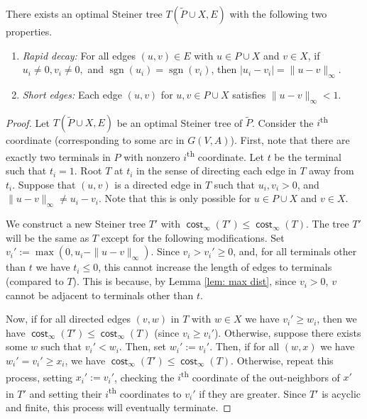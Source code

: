 \documentclass{article}\providecommand{\DeclareRedundantLanguages}[2]{}\usepackage[a4paper,margin=20mm]{geometry}
\DeclareMathOperator{\cost}{\mathsf{cost}}
\DeclareMathOperator{\sgn}{sgn}
\newcommand{\1}{\textbf{1}}
\renewcommand{\tilde}{\widetilde}
\begin{document}
\begin{lemma} \label{lem: structural props}
There exists an optimal Steiner tree $T(\tilde{P} \cup X, E)$ with the following two properties. 
\begin{enumerate}[label=(P\arabic*)]
\item \textit{Rapid decay:} For all edges $(u,v) \in E$ with $u \in P \cup X$ and $v \in X$, if $u_i\neq 0, v_i \neq 0,$ and $\sgn(u_i) = \sgn(v_i)$, then $|u_i - v_i| = \|u - v\|_{\infty}$. \label{cond: max decrease}
\item \textit{Short edges:} Each edge $(u, v)$ for $u,v \in P \cup X$ satisfies $\|u - v\|_{\infty} < 1.$ \label{cond: short edges}
\end{enumerate}
\end{lemma}
\begin{proof}
Let $T(\tilde{P} \cup X, E)$ be an optimal Steiner tree of $\tilde{P}$. Consider the $i$\textsuperscript{th} coordinate (corresponding to some arc in $G(V,A)$). First, note that there are exactly two terminals in $P$ with nonzero $i$\textsuperscript{th} coordinate. Let $t$ be the terminal such that $t_i = 1$. Root $T$ at $t_i$ in the sense of directing each edge in $T$ away from $t_i$. Suppose that $(u,v)$ is a directed edge in $T$ such that $u_i, v_i > 0$, and $\|u - v\|_{\infty} \neq u_i - v_i$. Note that this is only possible for $u \in P \cup X$ and $v \in X$.

We construct a new Steiner tree $T'$ with $\cost_{\infty}(T') \leq \cost_{\infty}(T)$. The tree $T'$ will be the same as $T$ except for the following modifications. Set $v_i'  := \max(0, u_i - \|u - v\|_{\infty})$. Since $v_i > v_i' \geq 0$, and, for all terminals other than $t$ we have $t_i \leq 0$, this cannot increase the length of edges to terminals (compared to $T$). This is because, by Lemma \ref{lem: max dist}, since $v_i > 0$, $v$ cannot be adjacent to terminals other than $t$.
 
 Now, if for all directed edges $(v, w)$ in $T$ with $w \in X$ we have $v_i' \geq w_i$, then we have $\cost_{\infty}(T') \leq \cost_{\infty}(T)$ (since $v_i \geq v_i'$). Otherwise, suppose there exists some $w$ such that $v_i' < w_i$. Then, set $w_i'  := v_i'$. Then, if for all $(w,x)$ we have $w_i' = v_i' \geq x_i$, we have $\cost_{\infty}(T') \leq \cost_{\infty}(T)$. Otherwise, repeat this process, setting $x_i' := v_i'$, checking the $i$\textsuperscript{th} coordinate of the out-neighbors of $x'$ in $T'$ and setting their $i$\textsuperscript{th} coordinates to $v_i'$ if they are greater. Since  $T'$ is acyclic and finite, this process will eventually terminate. 
 

\end{proof}
\end{document}
